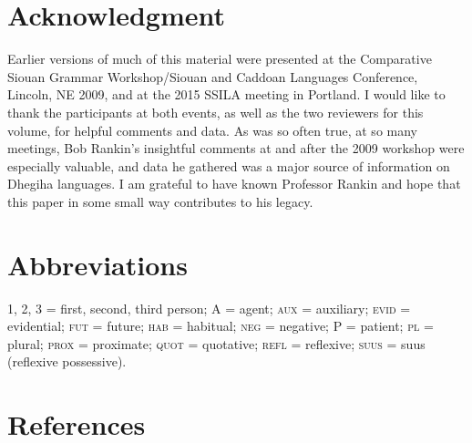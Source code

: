 \documentclass[output=paper]{LSP/langsci}
\begin{document}
\section*{Acknowledgment}

Earlier versions of much of this material were presented at the Comparative Siouan Grammar Workshop/Siouan and Caddoan Languages Conference, Lincoln, NE 2009, and at the 2015 SSILA meeting in Portland. I would like to thank the participants at both events, as well as the two reviewers for this volume, for helpful comments and data. As was so often true, at so many meetings, Bob Rankin's insightful comments at and after the 2009 workshop were especially valuable, and data he gathered was a major source of information on Dhegiha languages. I am grateful to have known Professor Rankin and hope that this paper in some small way contributes to his legacy.

\section*{Abbreviations}

1, 2, 3 = first, second, third person; A = agent; \textsc{aux} = auxiliary; \textsc{evid} = evidential; \textsc{fut} = future; \textsc{hab} = habitual; \textsc{neg} = negative; P = patient; \textsc{pl} = plural; \textsc{prox} = proximate; \textsc{quot} = quotative; \textsc{refl} = reflexive; \textsc{suus} = suus (reflexive possessive). 

\section*{References}


\printbibliography[heading=subbibliography,notkeyword=this]
\end{document}
